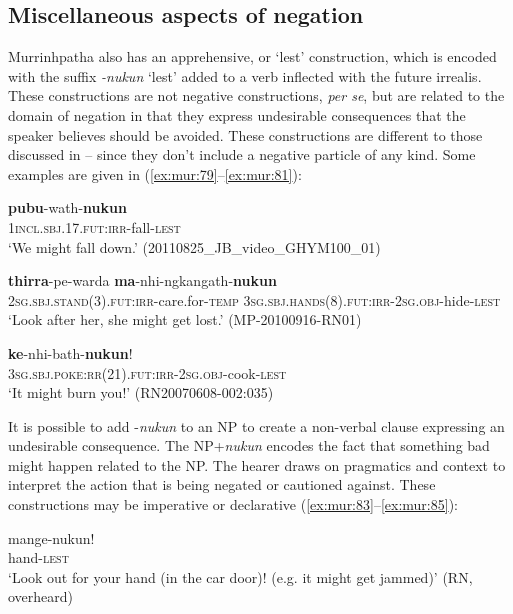 \documentclass[output=paper,colorlinks,citecolor=brown]{langscibook}
\begin{document}
\subsection{Miscellaneous aspects of negation} \label{sec:mur:2.6.2}

Murrinhpatha also has an apprehensive, or ‘lest’ construction, which is encoded with the suffix \textit{-nukun} ‘lest’ added to a verb inflected with the future irrealis. These constructions are not negative constructions, \textit{per se}, but are related to the domain of negation in that they express undesirable consequences that the speaker believes should be avoided. These constructions are different to those discussed in – since they don’t include a negative particle of any kind. Some examples are given in (\ref{ex:mur:79}--\ref{ex:mur:81}): 

\ea\label{ex:mur:79}
    \gll \textbf{pubu}{}-wath-\textbf{nukun}\\
         \textsc{1incl.sbj.17.fut:irr}{}-fall-\textsc{lest}\\
    \glt ‘We might fall down.’ (20110825\_JB\_video\_GHYM100\_01)
\z 

\ea\label{ex:mur:80}
    \gll \textbf{thirra}{}-pe-warda \textbf{ma}{}-nhi-ngkangath-\textbf{nukun} \\
         \textsc{2sg.sbj.stand(3).fut:irr}{}-care.for-\textsc{temp} \textsc{3sg.sbj.hands(8).fut:irr-2sg.obj-}hide\textsc{{}-lest} \\
    \glt ‘Look after her, she might get lost.’ (MP-20100916-RN01)
\z 

\ea\label{ex:mur:81}
    \gll \textbf{ke}{}-nhi-bath-\textbf{nukun}!\\
         \textsc{3sg.sbj.poke:rr(21).fut:irr}\textsc{-2sg.obj-}cook\textsc{{}-lest}\\
    \glt ‘It might burn you!’ (RN20070608-002:035)
\z 

It is possible to add -\textit{nukun} to an NP to create a non-verbal clause expressing an undesirable consequence. The NP+\textit{nukun} encodes the fact that something bad might happen related to the NP. The hearer draws on pragmatics and context to interpret the action that is being negated or cautioned against. These constructions may be imperative  or declarative (\ref{ex:mur:83}--\ref{ex:mur:85}):

\ea\label{ex:mur:82}
    \gll mange-nukun!\\
         hand-\textsc{lest}\\
    \glt ‘Look out for your hand (in the car door)! (e.g. it might get jammed)’ (RN, overheard)
\z 
\end{document}

